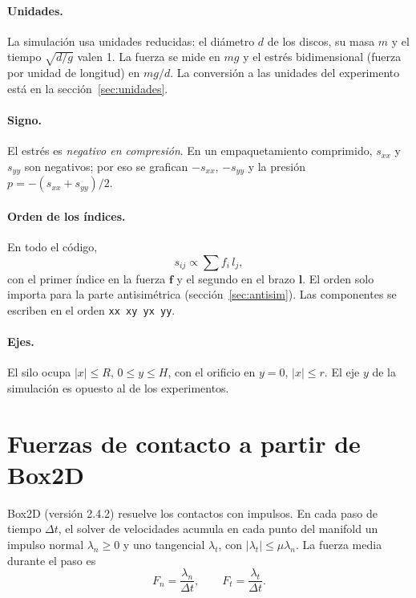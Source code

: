 \documentclass[11pt,a4paper]{article}
\newcommand{\vect}[1]{\mathbf{#1}}
\newcommand{\lv}{\vect{l}}
\newcommand{\f}{\vect{f}}
\newcommand{\code}[1]{\texttt{#1}}
\begin{document}
\paragraph{Unidades.} La simulación usa unidades reducidas: el diámetro
$d$ de los discos, su masa $m$ y el tiempo $\sqrt{d/g}$ valen 1. La
fuerza se mide en $mg$ y el estrés bidimensional (fuerza por unidad de
longitud) en $mg/d$. La conversión a las unidades del experimento está en
la sección~\ref{sec:unidades}.

\paragraph{Signo.} El estrés es \emph{negativo en compresión}. En un
empaquetamiento comprimido, $s_{xx}$ y $s_{yy}$ son negativos; por eso se
grafican $-s_{xx}$, $-s_{yy}$ y la presión $p = -(s_{xx}+s_{yy})/2$.

\paragraph{Orden de los índices.} En todo el código,
\begin{equation}
  s_{ij} \propto \sum f_i \, l_j ,
\end{equation}
con el primer índice en la fuerza $\f$ y el segundo en el brazo $\lv$. El
orden solo importa para la parte antisimétrica (sección~\ref{sec:antisim}). Las
componentes se escriben en el orden \code{xx xy yx yy}.

\paragraph{Ejes.} El silo ocupa $|x| \le R$, $0 \le y \le H$, con el
orificio en $y = 0$, $|x| \le r$. El eje $y$ de la simulación es opuesto
al de los experimentos.

\section{Fuerzas de contacto a partir de Box2D}
\label{sec:fuerzas}

Box2D (versión 2.4.2) resuelve los contactos con impulsos. En cada paso
de tiempo $\Delta t$, el solver de velocidades acumula en cada punto del
manifold un impulso normal $\lambda_n \ge 0$ y uno tangencial
$\lambda_t$, con $|\lambda_t| \le \mu \lambda_n$. La fuerza media durante
el paso es
\begin{equation}
  F_n = \frac{\lambda_n}{\Delta t}, \qquad
  F_t = \frac{\lambda_t}{\Delta t}.
\end{equation}
\end{document}
